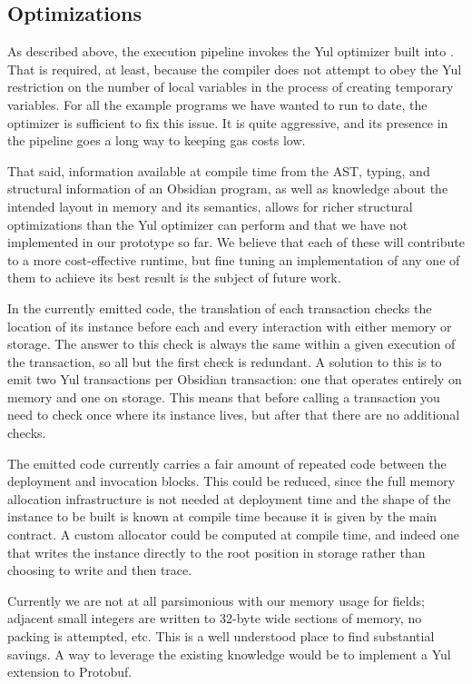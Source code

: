 \subsection{Optimizations}

As described above, the execution pipeline invokes the Yul optimizer built
into \solc. That is required, at least, because the compiler does not
attempt to obey the Yul restriction on the number of local variables in the
process of creating temporary variables. For all the example programs we
have wanted to run to date, the optimizer is sufficient to fix this
issue. It is quite aggressive, and its presence in the pipeline goes a long
way to keeping gas costs low.

That said, information available at compile time from the AST, typing, and
structural information of an Obsidian program, as well as knowledge about
the intended layout in memory and its semantics, allows for richer
structural optimizations than the Yul optimizer can perform and that we
have not implemented in our prototype so far. We believe that each of these
will contribute to a more cost-effective runtime, but fine tuning an
implementation of any one of them to achieve its best result is the subject
of future work.

In the currently emitted code, the translation of each transaction checks
the location of its instance before each and every interaction with either
memory or storage. The answer to this check is always the same within a
given execution of the transaction, so all but the first check is
redundant. A solution to this is to emit two Yul transactions per Obsidian
transaction: one that operates entirely on memory and one on storage. This
means that before calling a transaction you need to check once where its
instance lives, but after that there are no additional checks.

The emitted code currently carries a fair amount of repeated code between
the deployment and invocation blocks. This could be reduced, since the full
memory allocation infrastructure is not needed at deployment time and the
shape of the instance to be built is known at compile time because it is
given by the main contract. A custom allocator could be computed at compile
time, and indeed one that writes the instance directly to the root position
in storage rather than choosing to write and then trace.

Currently we are not at all parsimonious with our memory usage for fields;
adjacent small integers are written to 32-byte wide sections of memory, no
packing is attempted, etc. This is a well understood place to find
substantial savings. A way to leverage the existing knowledge would be to
implement a Yul extension to Protobuf. \cite{todo}

